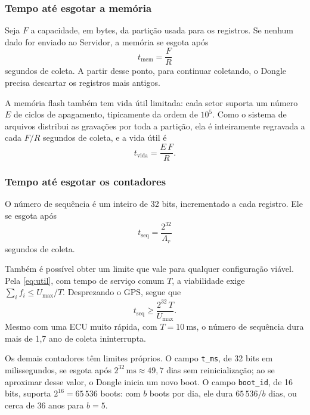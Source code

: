 \documentclass[12pt]{article}
\begin{document}
\subsubsection{Tempo até esgotar a memória}

Seja $F$ a capacidade, em bytes, da partição usada para os registros. Se nenhum dado for enviado ao Servidor, a memória se esgota após
\begin{equation}
  t_{\mathrm{mem}} = \frac{F}{R}
  \label{eq:tmem}
\end{equation}
segundos de coleta. A partir desse ponto, para continuar coletando, o Dongle precisa descartar os registros mais antigos.

A memória flash também tem vida útil limitada: cada setor suporta um número $E$ de ciclos de apagamento, tipicamente da ordem de $10^5$. Como o sistema de arquivos distribui as gravações por toda a partição, ela é inteiramente regravada a cada $F/R$ segundos de coleta, e a vida útil é
\begin{equation}
  t_{\mathrm{vida}} = \frac{E\,F}{R} .
  \label{eq:tvida}
\end{equation}

\subsubsection{Tempo até esgotar os contadores}

O número de sequência é um inteiro de 32 bits, incrementado a cada registro. Ele se esgota após
\begin{equation}
  t_{\mathrm{seq}} = \frac{2^{32}}{\Lambda_r}
  \label{eq:tseq}
\end{equation}
segundos de coleta. 

Também é possível obter um limite que vale para qualquer configuração viável. Pela \autoref{eq:util}, com tempo de serviço comum $T$, a viabilidade exige $\sum_i f_i \le U_{\max}/T$. Desprezando o GPS, segue que
\begin{equation}
  t_{\mathrm{seq}} \ge \frac{2^{32}\,T}{U_{\max}} .
  \label{eq:tseqmin}
\end{equation}
Mesmo com uma ECU muito rápida, com $T = \SI{10}{\milli\second}$, o número de sequência dura mais de 1,7 ano de coleta ininterrupta.

Os demais contadores têm limites próprios. O campo \texttt{t\_ms}, de 32 bits em milissegundos, se esgota após $2^{32}\,\si{\milli\second} \approx 49{,}7$ dias sem reinicialização; ao se aproximar desse valor, o Dongle inicia um novo boot. O campo \texttt{boot\_id}, de 16 bits, suporta $2^{16} = 65\,536$ boots: com $b$ boots por dia, ele dura $65\,536/b$ dias, ou cerca de 36 anos para $b = 5$.
\end{document}
